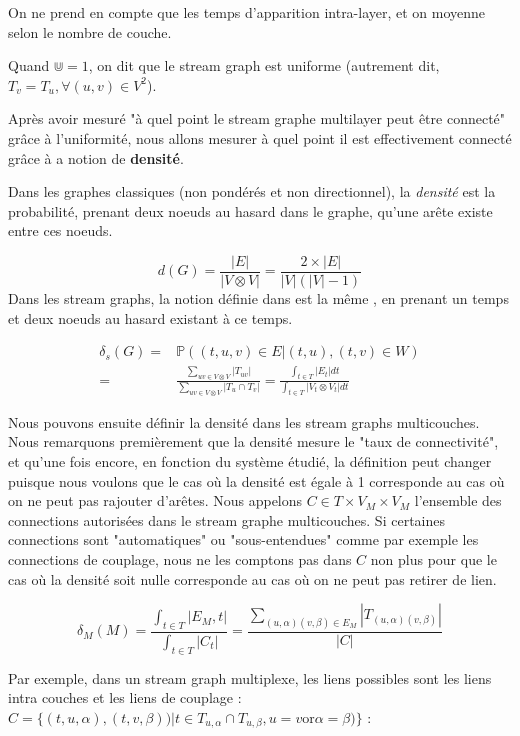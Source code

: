 \documentclass[11pt,a4paper]{article}
\theoremstyle{definition}
\theoremstyle{remark}
\theoremstyle{remark}
\begin{document}
    On ne prend en compte que les temps d'apparition intra-layer, et on moyenne selon le nombre de couche. 


	Quand $\Cup=1$, on dit que le stream graph est uniforme (autrement dit, $T_v = T_u, \forall (u,v) \in V^2$).


    Après avoir mesuré "à quel point le stream graphe multilayer peut être connecté" grâce à l'uniformité, nous allons mesurer à quel point il est effectivement connecté grâce à a notion de \textbf{densité}.
    
    Dans les graphes classiques (non pondérés et non directionnel), la {\em densité} est la probabilité, prenant deux noeuds au hasard dans le graphe, qu'une arête existe entre ces noeuds.
    
		\[
			d(G) = \frac{|E|}{|V\otimes V|} = \frac{2\times |E|}{|V|(|V|-1)}
		\]
	Dans les stream graphs, la notion définie dans \cite{stream} est la même , en prenant un temps et deux noeuds au hasard existant à ce temps. 	

		\begin{align*}
			\delta_s(G) = & \mathbb{P}((t,u,v)\in E| (t,u),(t,v) \in W) \\
			 =  & \frac{\sum_{uv \in V \otimes V}{|T_{uv}|}}{\sum_{uv \in V\otimes V}{|T_u\cap T_v|}}= \frac{\int_{t\in T}{|E_t|dt}}{\int_{t\in T}{|V_t\otimes V_t|dt}}
		\end{align*}
		
	Nous pouvons ensuite définir la densité dans les stream graphs multicouches. Nous remarquons premièrement que la densité mesure le "taux de connectivité", et qu'une fois encore, en fonction du système étudié, la définition peut changer puisque nous voulons que le cas où la densité est égale à 1 corresponde au cas où on ne peut pas rajouter d'arêtes. Nous appelons  $C \in T \times V_M\times V_M$ l'ensemble des connections autorisées dans le stream graphe multicouches. Si certaines connections sont "automatiques" ou "sous-entendues" comme par exemple les connections de couplage, nous ne les comptons pas dans $C$ non plus pour que le cas où la densité soit nulle corresponde au cas où on ne peut pas retirer de lien.


	\[
		\delta_M (M) 
		= \frac{\int_{t\in T}|E_M,t|}{\int_{t\in T}|C_t|} 
		= \frac{\sum_{(u,\alpha)(v,\beta) \in E_M}|T_{(u,\alpha)(v,\beta)}|}{|C|}
	\]

	Par exemple, dans un stream graph multiplexe, les liens possibles sont les liens intra couches et les liens de couplage : $C=\{(t,u,\alpha),(t,v,\beta))| t\in T_{u,\alpha} \cap T_{u,\beta}, u=v \text{or} \alpha = \beta)\}$ :
\end{document}
